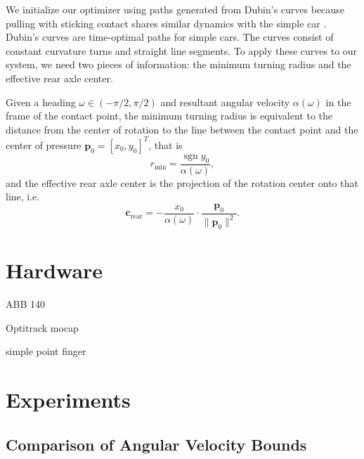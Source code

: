 \documentclass[conference]{IEEEtran}
\DeclareMathOperator{\sign}{\text{sgn}}
\begin{document}
We initialize our optimizer using paths generated from Dubin's curves
\cite{dubins1957curves} because pulling with sticking contact shares
similar dynamics with the simple car \cite{lavalle1999planning}.
Dubin's curves are time-optimal paths for simple cars. The curves
consist of constant curvature turns and straight line segments. To
apply these curves to our system, we need two pieces of information:
the minimum turning radius and the effective rear axle center. 

Given a heading $\omega \in (-\pi/2,\pi/2) $ and resultant angular velocity
$\alpha(\omega)$ in the frame of the contact point, the minimum
turning radius is equivalent to the distance from the center of
rotation to the line between the contact point and the center of
pressure $\mathbf{p}_0 = [x_0,y_0]^T$, that is
\begin{equation}
  r_{\text{min}} = \frac{\sign y_0}{\alpha(\omega)},
\end{equation}
and the effective rear axle center is the projection of the rotation center onto that line, i.e.
\begin{equation}
  \mathbf{c}_{\text{rear}} = -\frac{x_0}{\alpha(\omega)}\cdot\frac{\mathbf{p}_0}{\lVert \mathbf{p}_0 \rVert^2}.
\end{equation}

\section{Hardware}

\begin{inparaenum}
\item ABB 140
\item Optitrack mocap
\item simple point finger
\end{inparaenum}

\section{Experiments}\label{sec:experiments}

\subsection{Comparison of
  Angular Velocity Bounds}\label{sec:bound-comparison}
\end{document}
